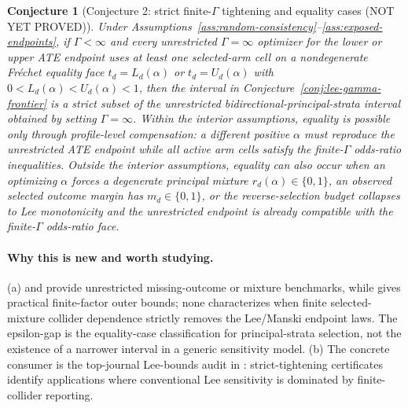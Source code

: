 \documentclass[11pt]{article}
\theoremstyle{definition}
\theoremstyle{plain}
\newtheorem{conjecture}{Conjecture}
\theoremstyle{remark}
\begin{document}
\begin{conjecture}[Conjecture 2: strict finite-\(\Gamma\) tightening and equality cases (NOT YET PROVED)]\label{conj:strict-tightening}
Under Assumptions~\ref{ass:random-consistency}--\ref{ass:exposed-endpoints}, if \(\Gamma<\infty\) and every unrestricted \(\Gamma=\infty\) optimizer for the lower or upper ATE endpoint uses at least one selected-arm cell on a nondegenerate Fréchet equality face \(t_d=L_d(\alpha)\) or \(t_d=U_d(\alpha)\) with \(0<L_d(\alpha)<U_d(\alpha)<1\), then the interval in Conjecture~\ref{conj:lee-gamma-frontier} is a strict subset of the unrestricted bidirectional-principal-strata interval obtained by setting \(\Gamma=\infty\).  Within the interior assumptions, equality is possible only through profile-level compensation: a different positive \(\alpha\) must reproduce the unrestricted ATE endpoint while all active arm cells satisfy the finite-\(\Gamma\) odds-ratio inequalities.  Outside the interior assumptions, equality can also occur when an optimizing \(\alpha\) forces a degenerate principal mixture \(r_d(\alpha)\in\{0,1\}\), an observed selected outcome margin has \(m_d\in\{0,1\}\), or the reverse-selection budget collapses to Lee monotonicity and the unrestricted endpoint is already compatible with the finite-\(\Gamma\) odds-ratio face.
\end{conjecture}
\paragraph{Why this is new and worth studying.}
(a) \citet{Manski1990NonparametricBounds} and \citet{HorowitzManski1995Censoring} provide unrestricted missing-outcome or mixture benchmarks, while \citet{SmithVanderWeele2019Selection} gives practical finite-factor outer bounds; none characterizes when finite selected-mixture collider dependence strictly removes the Lee/Manski endpoint laws.  The epsilon-gap is the equality-case classification for principal-strata selection, not the existence of a narrower interval in a generic sensitivity model.  (b) The concrete consumer is the top-journal Lee-bounds audit in \citet{KroftMourifieVayalinkal2024MultilayeredLee}: strict-tightening certificates identify applications where conventional Lee sensitivity is dominated by finite-collider reporting.
\end{document}

